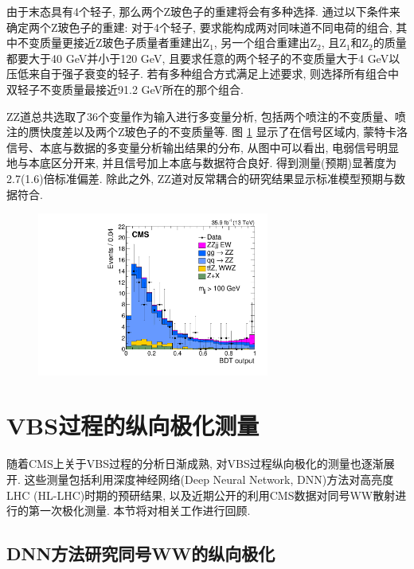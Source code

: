 \documentclass{SCIS2020cn}
\newcommand{\Zboson}{\text{Z}}
\begin{document}
由于末态具有4个轻子, 那么两个Z玻色子的重建将会有多种选择. 通过以下条件来确定两个Z玻色子的重建: 对于4个轻子, 要求能构成两对同味道不同电荷的组合, 其中不变质量更接近Z玻色子质量者重建出$\Zboson_1$, 另一个组合重建出$\Zboson_2$, 且$\Zboson_1$和$\Zboson_2$的质量都要大于40
GeV并小于120 GeV, 且要求任意的两个轻子的不变质量大于4 GeV以压低来自于强子衰变的轻子. 若有多种组合方式满足上述要求, 则选择所有组合中双轻子不变质量最接近91.2 GeV所在的那个组合. 

ZZ道总共选取了36个变量作为输入进行多变量分析, 包括两个喷注的不变质量、喷注的赝快度差以及两个Z玻色子的不变质量等. 图 \ref{fig:14} 显示了在信号区域内, 蒙特卡洛信号、本底与数据的多变量分析输出结果的分布, 从图中可以看出, 电弱信号明显地与本底区分开来, 并且信号加上本底与数据符合良好. 得到测量(预期)显著度为2.7(1.6)倍标准偏差. 除此之外, ZZ道对反常耦合的研究结果显示标准模型预期与数据符合. 

\begin{figure}[ht!]
\centering
\includegraphics[width=3in]{Figure-14.pdf}
\label{fig:14}
\end{figure}

\section{VBS过程的纵向极化测量}

随着CMS上关于VBS过程的分析日渐成熟, 对VBS过程纵向极化的测量也逐渐展开. 这些测量包括利用深度神经网络(Deep Neural Network, DNN)方法对高亮度LHC (HL-LHC)时期的预研结果, 以及近期公开的利用CMS数据对同号WW散射进行的第一次极化测量. 本节将对相关工作进行回顾. 

\subsection{DNN方法研究同号WW的纵向极化}
\end{document}
